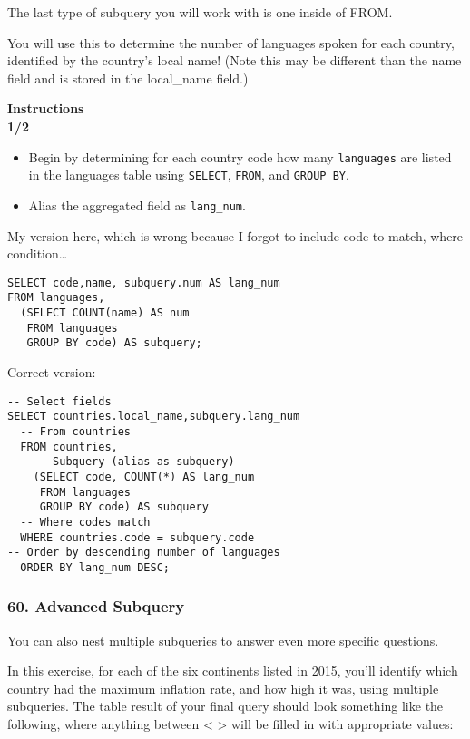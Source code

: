 \documentclass[
]{article}
\providecommand{\tightlist}{%
  \setlength{\itemsep}{0pt}\setlength{\parskip}{0pt}}
\begin{document}
The last type of subquery you will work with is one inside of FROM.

You will use this to determine the number of languages spoken for each
country, identified by the country's local name! (Note this may be
different than the name field and is stored in the local\_name field.)

\textbf{Instructions}\\
\textbf{1/2}

\begin{itemize}
\tightlist
\item
  Begin by determining for each country code how many \texttt{languages}
  are listed in the languages table using \texttt{SELECT},
  \texttt{FROM}, and \texttt{GROUP\ BY}.\\
\item
  Alias the aggregated field as \texttt{lang\_num}.
\end{itemize}

My version here, which is wrong because I forgot to include code to
match, where condition\ldots{}

\begin{verbatim}
SELECT code,name, subquery.num AS lang_num
FROM languages, 
  (SELECT COUNT(name) AS num
   FROM languages
   GROUP BY code) AS subquery;
\end{verbatim}

Correct version:

\begin{verbatim}
-- Select fields
SELECT countries.local_name,subquery.lang_num
  -- From countries
  FROM countries,
    -- Subquery (alias as subquery)
    (SELECT code, COUNT(*) AS lang_num
     FROM languages
     GROUP BY code) AS subquery
  -- Where codes match
  WHERE countries.code = subquery.code
-- Order by descending number of languages
  ORDER BY lang_num DESC;
\end{verbatim}

\hypertarget{advanced-subquery}{%
\subsubsection{60. Advanced Subquery}\label{advanced-subquery}}

You can also nest multiple subqueries to answer even more specific
questions.

In this exercise, for each of the six continents listed in 2015, you'll
identify which country had the maximum inflation rate, and how high it
was, using multiple subqueries. The table result of your final query
should look something like the following, where anything between
\textless{} \textgreater{} will be filled in with appropriate values:
\end{document}
